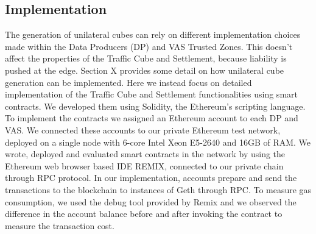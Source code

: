 \documentclass[chi_draft]{sigchi}
\begin{document}




\subsection{Implementation}
The generation of unilateral cubes can rely on different implementation choices made within the Data Producers (DP) and VAS Trusted Zones. This doesn’t affect the properties of the Traffic Cube and Settlement, because liability is pushed at the edge. Section X provides some detail on how unilateral cube generation can be implemented. 
Here we instead focus on detailed implementation of the Traffic Cube and Settlement functionalities using smart contracts. 
We developed them using Solidity, the Ethereum’s scripting language. To implement the contracts we assigned an Ethereum account to each DP and VAS. We connected these accounts to our private Ethereum test network, deployed on a single node with 6-core Intel Xeon E5-2640 and 16GB of RAM. We wrote, deployed and evaluated smart contracts in the network by using the Ethereum web browser based IDE REMIX, connected to our private chain through RPC protocol. In our implementation, accounts prepare and send the transactions to the blockchain to instances of Geth through RPC. To measure gas consumption, we used the debug tool provided by Remix and we observed the difference in the account balance before and after invoking the contract to measure the transaction cost.
\end{document}
